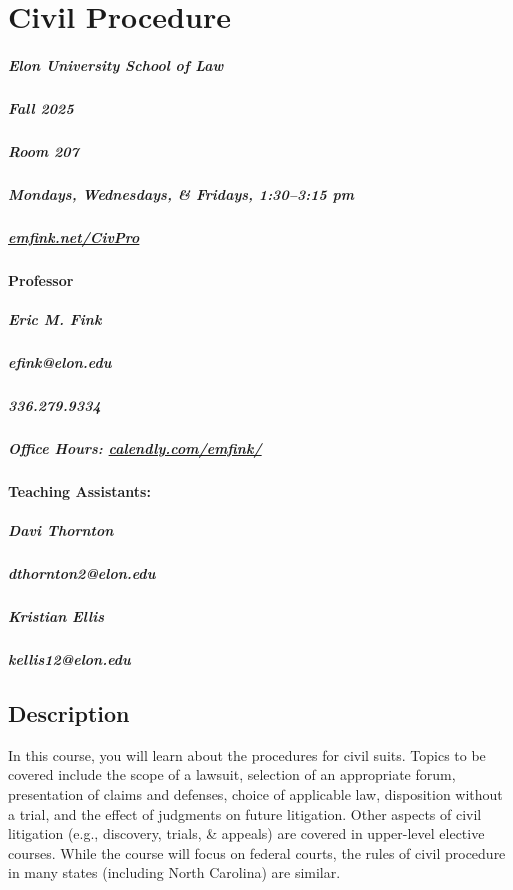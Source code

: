 \documentclass[11pt,letterpaper,twoside]{article}
\begin{document}
\thispagestyle{empty}

\color{OffBlack}


\section{Civil Procedure}

\begin{footnotesize}
\subparagraph{Elon University School of Law}
\subparagraph{Fall 2025}
\subparagraph{Room 207}
\subparagraph{Mondays, Wednesdays, \& Fridays, 1:30--3:15 pm}
\subparagraph{\url{emfink.net/CivPro}}
\vspace{1em}

\paragraph{Professor}
\subparagraph{Eric M. Fink} 
\subparagraph{efink@elon.edu}
\subparagraph{336.279.9334} 
\subparagraph{Office Hours: {\url{calendly.com/emfink/}}}

\vspace{1em}

\paragraph{Teaching Assistants:}
\subparagraph{Davi Thornton}
\subparagraph{dthornton2@elon.edu}
\vspace{.5em}
\subparagraph{Kristian Ellis}
\subparagraph{kellis12@elon.edu}
\end{footnotesize}

\vspace{1em}


\subsection{Description}\label{description}

In this course, you will learn about the procedures for civil suits.
Topics to be covered include the scope of a lawsuit, selection of an
appropriate forum, presentation of claims and defenses, choice of
applicable law, disposition without a trial, and the effect of judgments
on future litigation. Other aspects of civil litigation (e.g.,
discovery, trials, \& appeals) are covered in upper-level elective
courses. While the course will focus on federal courts, the rules of
civil procedure in many states (including North Carolina) are similar.
\end{document}
